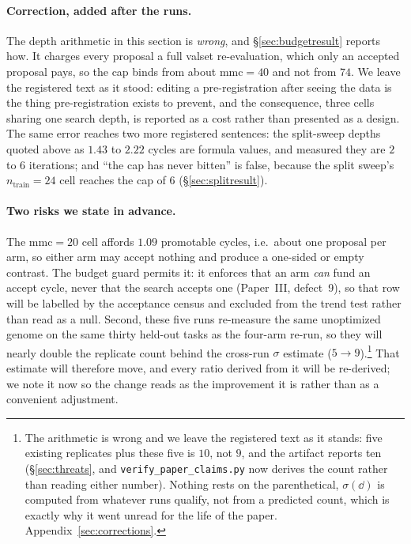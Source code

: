 \documentclass[11pt]{article}
\begin{document}
\paragraph{Correction, added after the runs.} The depth arithmetic in this section is
\emph{wrong}, and \S\ref{sec:budgetresult} reports how. It charges every proposal a full valset
re-evaluation, which only an accepted proposal pays, so the cap binds from about
$\mathrm{mmc}=40$ and not from $74$. We leave the registered text as it stood: editing a
pre-registration after seeing the data is the thing pre-registration exists to prevent, and the
consequence, three cells sharing one search depth, is reported as a cost rather than presented as
a design. The same error reaches two more registered sentences: the split-sweep depths quoted
above as $1.43$ to $2.22$ cycles are formula values, and measured they are $2$ to $6$ iterations;
and ``the cap has never bitten'' is false, because the split sweep's $n_{\mathrm{train}}{=}24$
cell reaches the cap of $6$ (\S\ref{sec:splitresult}).

\paragraph{Two risks we state in advance.} The $\mathrm{mmc}{=}20$ cell affords $1.09$ promotable
cycles, i.e.\ about one proposal per arm, so either arm may accept nothing and produce a
one-sided or empty contrast. The budget guard permits it: it enforces that an arm \emph{can}
fund an accept cycle, never that the search accepts one (Paper~III, defect~9), so that row will be labelled by
the acceptance census and excluded from the trend test rather than read as a null. Second, these
five runs re-measure the same unoptimized genome on the same thirty held-out tasks as the four-arm
re-run, so they will nearly double the replicate count behind the cross-run $\sigma$ estimate
($5 \to 9$).\footnote{The arithmetic is wrong and we leave the registered text as it stands: five
existing replicates plus these five is $10$, not $9$, and the artifact reports ten
(\S\ref{sec:threats}, and \texttt{verify\_paper\_claims.py} now derives the count rather than
reading either number). Nothing rests on the parenthetical, $\sigma(\dd)$ is computed from
whatever runs qualify, not from a predicted count, which is exactly why it went unread for the
life of the paper. Appendix~\ref{sec:corrections}.} That estimate will therefore move, and every ratio derived from it will be
re-derived; we note it now so the change reads as the improvement it is rather than as a
convenient adjustment.
\end{document}
